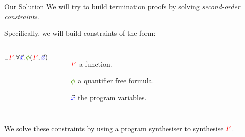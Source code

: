 \documentclass[xcolor=pdftex,t,11pt]{beamer}
\newcommand{\red}[1]{\textcolor{red}{#1}}
\newcommand{\blue}[1]{\textcolor{blue}{#1}}
\newcommand{\green}[1]{\textcolor{ta3chameleon}{#1}}
\begin{document}
\begin{frame}[fragile]{Our Solution}
 We will try to build termination proofs by solving \emph{second-order constraints}.

 \pause
 
 \vspace{1em}

 Specifically, we will build constraints of the form:

 \begin{center}
 \begin{columns}
  $\exists \red{F} . \forall \vec{\blue{x}} . \green{\phi}(\red{F}, \vec{\blue{x}})$

  \begin{minipage}{\textwidth}
 \begin{itemize}
  \item[$\red{F}$] a function.
  \item[$\green{\phi}$] a quantifier free formula.
  \item[$\vec{\blue{x}}$] the program variables.
 \end{itemize}
 \end{minipage}
 \end{columns}

 \end{center}

 \vspace{.75em}

 We solve these constraints by using a program synthesiser to synthesise $\red{F}$\footnotemark.
 
\end{frame}
\end{document}
